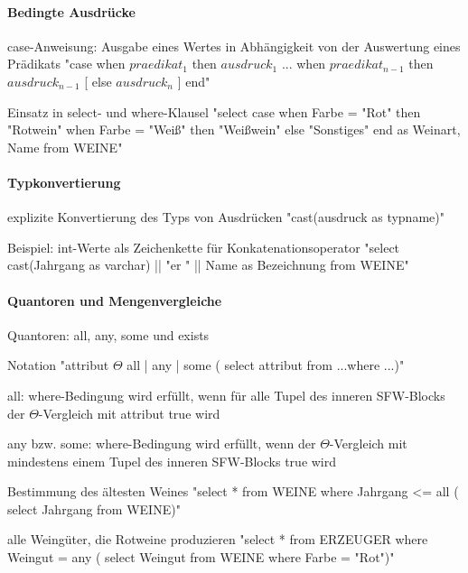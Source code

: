 \documentclass[a4paper]{article}
\begin{document}
\begin{multicols}{3}
\paragraph{Bedingte Ausdrücke}
\begin{itemize*}
    \item case-Anweisung: Ausgabe eines Wertes in Abhängigkeit von der Auswertung eines Prädikats
    "case when $praedikat_1$ then $ausdruck_1$ ... when $praedikat_{n-1}$ then $ausdruck_{n-1}$ [ else $ausdruck_n$ ] end"
    \item Einsatz in select- und where-Klausel
    "select case when Farbe = "Rot" then "Rotwein" when Farbe = "Weiß" then "Weißwein" else "Sonstiges" end as Weinart, Name from WEINE"
\end{itemize*}

\paragraph{Typkonvertierung}
\begin{itemize*}
    \item explizite Konvertierung des Typs von Ausdrücken
    "cast(ausdruck as typname)"
    \item Beispiel: int-Werte als Zeichenkette für Konkatenationsoperator
    "select cast(Jahrgang as varchar) || "er " || Name as Bezeichnung from WEINE"
\end{itemize*}

\paragraph{Quantoren und Mengenvergleiche}
\begin{itemize*}
    \item Quantoren: all, any, some und exists
    \item Notation
    "attribut $\Theta$ { all | any | some } ( select attribut from ...where ...)"
    \item all: where-Bedingung wird erfüllt, wenn für alle Tupel des inneren SFW-Blocks der $\Theta$-Vergleich mit attribut true wird
    \item any bzw. some: where-Bedingung wird erfüllt, wenn der $\Theta$-Vergleich mit mindestens einem Tupel des inneren SFW-Blocks true wird
    \item Bestimmung des ältesten Weines
    "select * from WEINE where Jahrgang <= all ( select Jahrgang from WEINE)"
    \item alle Weingüter, die Rotweine produzieren
    "select * from ERZEUGER where Weingut = any ( select Weingut from WEINE where Farbe = "Rot")"
\end{itemize*}


\end{multicols}
\end{document}
